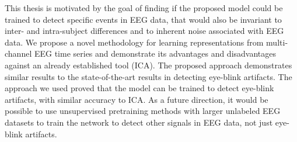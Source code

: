 \documentclass[12pt,a4paper,titlepage,openany]{report}
\begin{document}
This thesis is motivated by the goal of finding if the proposed model could be trained to detect specific events in EEG data, that would also be invariant to inter- and intra-subject differences and to inherent noise associated with EEG data. We propose a novel methodology for learning representations from multi-channel EEG time series and demonstrate its advantages and disadvantages against an already established tool (ICA). The proposed approach demonstrates similar results to the state-of-the-art results in detecting eye-blink artifacts. The approach we used proved that the model can be trained to detect eye-blink artifacts, with similar accuracy to ICA.
As a future direction, it would be possible to use unsupervised pretraining methods with larger unlabeled EEG datasets to train the network to detect other signals in EEG data, not just eye-blink artifacts.


\end{document}
